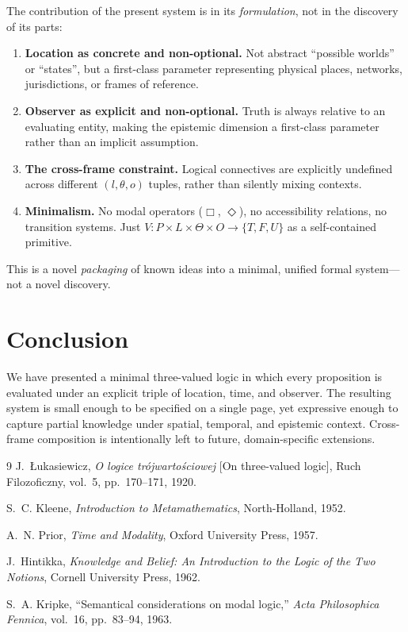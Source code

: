 \documentclass[11pt,a4paper]{article}
\begin{document}
The contribution of the present system is in its \emph{formulation}, not in
the discovery of its parts:
\begin{enumerate}
  \item \textbf{Location as concrete and non-optional.} Not abstract
  ``possible worlds'' or ``states'', but a first-class parameter representing
  physical places, networks, jurisdictions, or frames of reference.
  \item \textbf{Observer as explicit and non-optional.} Truth is always
  relative to an evaluating entity, making the epistemic dimension a
  first-class parameter rather than an implicit assumption.
  \item \textbf{The cross-frame constraint.} Logical connectives are
  explicitly undefined across different $(l, \theta, o)$ tuples, rather than
  silently mixing contexts.
  \item \textbf{Minimalism.} No modal operators ($\Box$, $\Diamond$), no
  accessibility relations, no transition systems. Just
  $V : P \times L \times \Theta \times O \to \{T, F, U\}$ as a self-contained
  primitive.
\end{enumerate}

This is a novel \emph{packaging} of known ideas into a minimal, unified formal
system---not a novel discovery.

\section{Conclusion}
We have presented a minimal three-valued logic in which every proposition is
evaluated under an explicit triple of location, time, and observer. The
resulting system is small enough to be specified on a single page, yet
expressive enough to capture partial knowledge under spatial, temporal, and
epistemic context. Cross-frame composition is intentionally left to future,
domain-specific extensions.

\begin{thebibliography}{9}
J.~{\L}ukasiewicz, \emph{O logice tr\'ojwarto\'sciowej} [On three-valued
logic], Ruch Filozoficzny, vol.~5, pp.~170--171, 1920.

S.~C. Kleene, \emph{Introduction to Metamathematics}, North-Holland, 1952.

A.~N. Prior, \emph{Time and Modality}, Oxford University Press, 1957.

J.~Hintikka, \emph{Knowledge and Belief: An Introduction to the Logic of the
Two Notions}, Cornell University Press, 1962.

S.~A. Kripke, ``Semantical considerations on modal logic,''
\emph{Acta Philosophica Fennica}, vol.~16, pp.~83--94, 1963.
\end{thebibliography}
\end{document}
